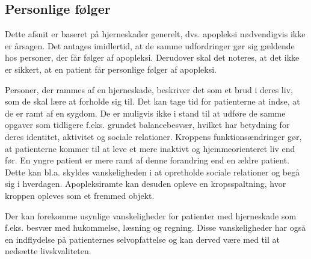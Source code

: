 \subsection{Personlige følger} \label{Personlige_foelger}
Dette afsnit er baseret på hjerneskader generelt, dvs. apopleksi nødvendigvis ikke er årsagen. Det antages imidlertid, at de samme udfordringer gør sig gældende hos personer, der får følger af apopleksi. Derudover skal det noteres, at det ikke er sikkert, at en patient får personlige følger af apopleksi.

Personer, der rammes af en hjerneskade, beskriver det som et brud i deres liv, som de skal lære at forholde sig til. Det kan tage tid for patienterne at indse, at de er ramt af en sygdom. De er muligvis ikke i stand til at udføre de samme opgaver som tidligere f.eks. grundet balancebesvær, hvilket har betydning for deres identitet, aktivitet og sociale relationer. Kroppens funktionsændringer gør, at patienterne kommer til at leve et mere inaktivt og hjemmeorienteret liv end før. En yngre patient er mere ramt af denne forandring end en ældre patient. Dette kan bl.a. skyldes vanskeligheden i at opretholde sociale relationer og begå sig i hverdagen. Apopleksiramte kan desuden opleve en kropsspaltning, hvor kroppen opleves som et fremmed objekt. \cite{Sundhedsstyrelsen2010,Badke2009}

Der kan forekomme usynlige vanskeligheder for patienter med hjerneskade som f.eks. besvær med hukommelse, læsning og regning. Disse vanskeligheder har også en indflydelse på patienternes selvopfattelse og kan derved være med til at nedsætte livskvaliteten. \cite{Sundhedsstyrelsen2010} 




